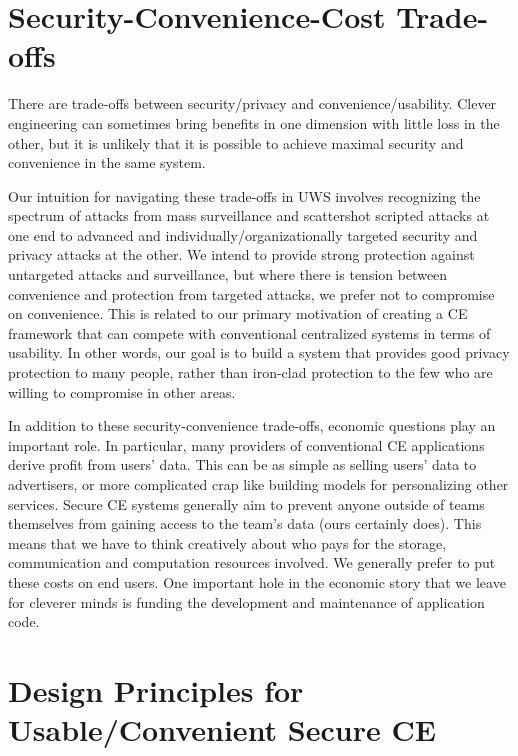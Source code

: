 \documentclass{article}
\begin{document}
\section{Security-Convenience-Cost Trade-offs}

There are trade-offs between security/privacy and convenience/usability.
Clever engineering can sometimes bring benefits in one dimension with little loss in the other, but it is unlikely that it is possible to achieve maximal security and convenience in the same system.

Our intuition for navigating these trade-offs in UWS involves recognizing the spectrum of attacks from mass surveillance and scattershot scripted attacks at one end to advanced and individually/organizationally targeted security and privacy attacks at the other.
We intend to provide strong protection against untargeted attacks and surveillance, but where there is tension between convenience and protection from targeted attacks, we prefer not to compromise on convenience.
This is related to our primary motivation of creating a CE framework that can compete with conventional centralized systems in terms of usability.
In other words, our goal is to build a system that provides good privacy protection to many people, rather than iron-clad protection to the few who are willing to compromise in other areas.

In addition to these security-convenience trade-offs, economic questions play an important role.
In particular, many providers of conventional CE applications derive profit from users' data.
This can be as simple as selling users' data to advertisers, or more complicated crap like building models for personalizing other services.
Secure CE systems generally aim to prevent anyone outside of teams themselves from gaining access to the team's data (ours certainly does).
This means that we have to think creatively about who pays for the storage, communication and computation resources involved.
We generally prefer to put these costs on end users.
One important hole in the economic story that we leave for cleverer minds is funding the development and maintenance of application code.


\section{Design Principles for Usable/Convenient Secure CE}
\end{document}
